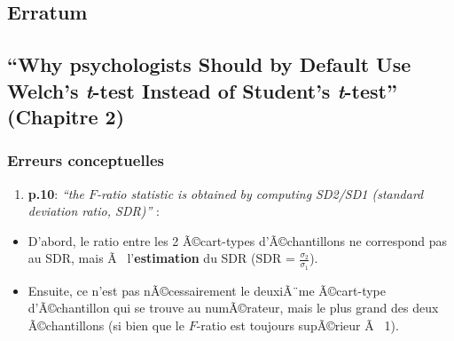 \clearpage



\begin{appendix}
\hypertarget{erratum}{%
\section{Erratum}\label{erratum}}

\hypertarget{why-psychologists-should-by-default-use-welchs-t-test-instead-of-students-t-test-chapitre-2}{%
\subsection{\texorpdfstring{``Why psychologists Should by Default Use
Welch's \emph{t}-test Instead of Student's \emph{t}-test'' (Chapitre
2)}{``Why psychologists Should by Default Use Welch's t-test Instead of Student's t-test'' (Chapitre 2)}}\label{why-psychologists-should-by-default-use-welchs-t-test-instead-of-students-t-test-chapitre-2}}

\hypertarget{erreurs-conceptuelles}{%
\subsubsection{Erreurs conceptuelles}\label{erreurs-conceptuelles}}

\begin{enumerate}
\def\labelenumi{\arabic{enumi})}
\tightlist
\item
  \textbf{p.10}: \emph{``the \(F\)-ratio statistic is obtained by
  computing SD2/SD1 (standard deviation ratio, SDR)''} :\\
\end{enumerate}

\begin{itemize}
\tightlist
\item
  D'abord, le ratio entre les 2 Ã©cart-types d'Ã©chantillons ne
  correspond pas au SDR, mais Ã~ l'\textbf{estimation} du SDR (SDR =
  \(\frac{\sigma_2}{\sigma_1}\)).\\
\item
  Ensuite, ce n'est pas nÃ©cessairement le deuxiÃ¨me Ã©cart-type
  d'Ã©chantillon qui se trouve au numÃ©rateur, mais le plus grand des
  deux Ã©chantillons (si bien que le \(F\)-ratio est toujours supÃ©rieur
  Ã~ 1).
\end{itemize}


\end{appendix}

